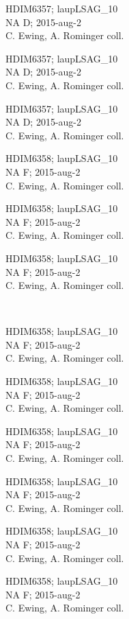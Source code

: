 \documentclass[2pt]{extarticle}
\begin{document}
\noindent
\parbox{0.16\textwidth}{\tiny \raggedright \rule[-0.3\baselineskip]{0pt}{10pt}HDIM6357; laupLSAG\_10\\ NA D; 2015-aug-2\\ C. Ewing, A. Rominger coll.}
\parbox{0.16\textwidth}{\tiny \raggedright \rule[-0.3\baselineskip]{0pt}{10pt}HDIM6357; laupLSAG\_10\\ NA D; 2015-aug-2\\ C. Ewing, A. Rominger coll.}
\parbox{0.16\textwidth}{\tiny \raggedright \rule[-0.3\baselineskip]{0pt}{10pt}HDIM6357; laupLSAG\_10\\ NA D; 2015-aug-2\\ C. Ewing, A. Rominger coll.}
\parbox{0.16\textwidth}{\tiny \raggedright \rule[-0.3\baselineskip]{0pt}{10pt}HDIM6358; laupLSAG\_10\\ NA F; 2015-aug-2\\ C. Ewing, A. Rominger coll.}
\parbox{0.16\textwidth}{\tiny \raggedright \rule[-0.3\baselineskip]{0pt}{10pt}HDIM6358; laupLSAG\_10\\ NA F; 2015-aug-2\\ C. Ewing, A. Rominger coll.}
\parbox{0.16\textwidth}{\tiny \raggedright \rule[-0.3\baselineskip]{0pt}{10pt}HDIM6358; laupLSAG\_10\\ NA F; 2015-aug-2\\ C. Ewing, A. Rominger coll.} \\ 
\vspace{0.001in} 

\noindent
\parbox{0.16\textwidth}{\tiny \raggedright \rule[-0.3\baselineskip]{0pt}{10pt}HDIM6358; laupLSAG\_10\\ NA F; 2015-aug-2\\ C. Ewing, A. Rominger coll.}
\parbox{0.16\textwidth}{\tiny \raggedright \rule[-0.3\baselineskip]{0pt}{10pt}HDIM6358; laupLSAG\_10\\ NA F; 2015-aug-2\\ C. Ewing, A. Rominger coll.}
\parbox{0.16\textwidth}{\tiny \raggedright \rule[-0.3\baselineskip]{0pt}{10pt}HDIM6358; laupLSAG\_10\\ NA F; 2015-aug-2\\ C. Ewing, A. Rominger coll.}
\parbox{0.16\textwidth}{\tiny \raggedright \rule[-0.3\baselineskip]{0pt}{10pt}HDIM6358; laupLSAG\_10\\ NA F; 2015-aug-2\\ C. Ewing, A. Rominger coll.}
\parbox{0.16\textwidth}{\tiny \raggedright \rule[-0.3\baselineskip]{0pt}{10pt}HDIM6358; laupLSAG\_10\\ NA F; 2015-aug-2\\ C. Ewing, A. Rominger coll.}
\parbox{0.16\textwidth}{\tiny \raggedright \rule[-0.3\baselineskip]{0pt}{10pt}HDIM6358; laupLSAG\_10\\ NA F; 2015-aug-2\\ C. Ewing, A. Rominger coll.} \\ 
\vspace{0.001in} 
\end{document}
